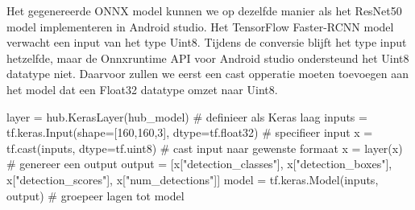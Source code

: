 Het gegenereerde ONNX model kunnen we op dezelfde manier als het ResNet50 model implementeren in Android studio.
Het TensorFlow Faster-RCNN model verwacht een input van het type Uint8.
Tijdens de conversie blijft het type input hetzelfde, maar de Onnxruntime API voor Android studio ondersteund het Uint8 datatype niet.
Daarvoor zullen we eerst een cast opperatie moeten toevoegen aan het model dat een Float32 datatype omzet naar Uint8.

\begin{python}
layer = hub.KerasLayer(hub_model) # definieer als Keras laag
inputs = tf.keras.Input(shape=[160,160,3], dtype=tf.float32) # specifieer input
x = tf.cast(inputs, dtype=tf.uint8) # cast input naar gewenste formaat
x = layer(x) # genereer een output
output = [x["detection_classes"], x["detection_boxes"], x["detection_scores"], x["num_detections"]]
model = tf.keras.Model(inputs, output) # groepeer lagen tot model
\end{python}


